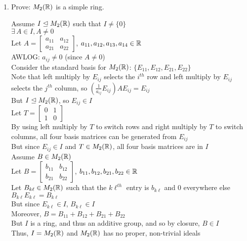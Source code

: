 \documentclass[letterpaper,12pt,fleqn]{article}
\newcommand{\ide}{\trianglelefteq}
\begin{document}
\begin{enumerate}
  \newpage

  \newcommand{\mr}{M_2(\R)}

\item Prove: $\mr$ is a simple ring.

  Assume $I\ide\mr$ such that $I\ne\{0\}$ \\
  $\exists\,A\in I,A\ne0$ \\
  Let $A=\begin{bmatrix} a_{11} & a_{12} \\ a_{21} & a_{22} \end{bmatrix}$,
  $a_{11},a_{12},a_{13},a_{14}\in\mathbb{R}$ \\
  AWLOG: $a_{ij}\ne0$ (since $A\ne0$) \\
  Consider the standard basis for $\mr$: $\{E_{11},E_{12},E_{21},E_{22}\}$ \\
  Note that left multiply by $E_{ij}$ selects the $i^{th}$ row and left multiply by
  $E_{ij}$ selects the $j^{th}$ column, so
  $\left(\frac{1}{a_{ij}}E_{ij}\right)AE_{ij}=E_{ij}$ \\
  But $I\ide\mr$, so $E_{ij}\in I$ \\
  Let $T=\begin{bmatrix} 0 & 1 \\ 1 & 0 \end{bmatrix}$ \\
  By using left multiply by $T$ to switch rows and right multiply by $T$ to switch
  columns, all four basis matrices can be generated from $E_{ij}$ \\
  But since $E_{ij}\in I$ and $T\in\mr$, all four basis matrices are in $I$ \\
  Assume $B\in\mr$ \\
  Let $B=\begin{bmatrix} b_{11} & b_{12} \\ b_{21} & b_{22} \end{bmatrix}$,
  $b_{11},b_{12},b_{21},b_{22}\in\mathbb{R}$ \\
  Let $B_{k\ell}\in\mr$ such that the $k\ell^{th}$ entry is $b_{k\ell}$ and $0$ everywhere
  else \\
  $B_{k\ell}E_{k\ell}=B_{k\ell}$ \\
  But since $E_{k\ell}\in I$, $B_{k\ell}\in I$ \\
  Moreover, $B=B_{11}+B_{12}+B_{21}+B_{22}$ \\
  But $I$ is a ring, and thus an additive group, and so by closure, $B\in I$ \\
  Thus, $I=\mr$ and $\mr$ has no proper, non-trivial ideals


\end{enumerate}
\end{document}
